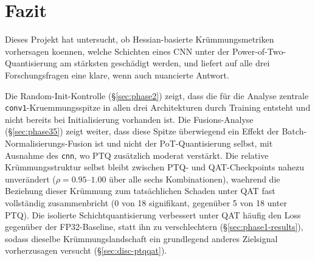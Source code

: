 \section{Fazit}
\label{sec:conclusion}

Dieses Projekt hat untersucht, ob Hessian-basierte Krümmungsmetriken vorhersagen koennen, welche Schichten eines CNN unter der Power-of-Two-Quantisierung am stärksten geschädigt werden, und liefert auf alle drei Forschungsfragen eine klare, wenn auch nuancierte Antwort.
\par\medskip

Die Random-Init-Kontrolle (\S\ref{sec:phase2}) zeigt, dass die für die Analyse zentrale \texttt{conv1}-Kruemmungsspitze in allen drei Architekturen durch Training entsteht und nicht bereits bei Initialisierung vorhanden ist. Die Fusions-Analyse (\S\ref{sec:phase35}) zeigt weiter, dass diese Spitze überwiegend ein Effekt der Batch-Normalisierungs-Fusion ist und nicht der PoT-Quantisierung selbst, mit Ausnahme des \texttt{cnn}, wo PTQ zusätzlich moderat verstärkt. Die relative Krümmungsstruktur selbst bleibt zwischen PTQ- und QAT-Checkpoints nahezu unverändert ($\rho=0.95$--$1.00$ über alle sechs Kombinationen), waehrend die Beziehung dieser Krümmung zum tatsächlichen Schaden unter QAT fast vollständig zusammenbricht (0 von 18 signifikant, gegenüber 5 von 18 unter PTQ). Die isolierte Schichtquantisierung verbessert unter QAT häufig den Loss gegenüber der FP32-Baseline, statt ihn zu verschlechtern (\S\ref{sec:phase1-results}), sodass dieselbe Krümmungslandschaft ein grundlegend anderes Zielsignal vorherzusagen versucht (\S\ref{sec:disc-ptqqat}).
\par\medskip

